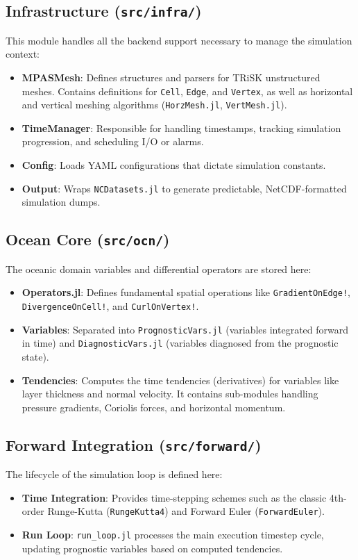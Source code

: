 \documentclass[12pt]{my-preprint}
\begin{document}
\subsection{Infrastructure (\texttt{src/infra/})}
This module handles all the backend support necessary to manage the simulation context:
\begin{itemize}
    \item \textbf{MPASMesh}: Defines structures and parsers for TRiSK unstructured meshes. Contains definitions for \texttt{Cell}, \texttt{Edge}, and \texttt{Vertex}, as well as horizontal and vertical meshing algorithms (\texttt{HorzMesh.jl}, \texttt{VertMesh.jl}).
    \item \textbf{TimeManager}: Responsible for handling timestamps, tracking simulation progression, and scheduling I/O or alarms.
    \item \textbf{Config}: Loads YAML configurations that dictate simulation constants.
    \item \textbf{Output}: Wraps \texttt{NCDatasets.jl} to generate predictable, NetCDF-formatted simulation dumps.
\end{itemize}

\subsection{Ocean Core (\texttt{src/ocn/})}
The oceanic domain variables and differential operators are stored here:
\begin{itemize}
    \item \textbf{Operators.jl}: Defines fundamental spatial operations like \texttt{GradientOnEdge!}, \texttt{DivergenceOnCell!}, and \texttt{CurlOnVertex!}.
    \item \textbf{Variables}: Separated into \texttt{PrognosticVars.jl} (variables integrated forward in time) and \texttt{DiagnosticVars.jl} (variables diagnosed from the prognostic state).
    \item \textbf{Tendencies}: Computes the time tendencies (derivatives) for variables like layer thickness and normal velocity. It contains sub-modules handling pressure gradients, Coriolis forces, and horizontal momentum.
\end{itemize}

\subsection{Forward Integration (\texttt{src/forward/})}
The lifecycle of the simulation loop is defined here:
\begin{itemize}
    \item \textbf{Time Integration}: Provides time-stepping schemes such as the classic 4th-order Runge-Kutta (\texttt{RungeKutta4}) and Forward Euler (\texttt{ForwardEuler}).
    \item \textbf{Run Loop}: \texttt{run\_loop.jl} processes the main execution timestep cycle, updating prognostic variables based on computed tendencies.
\end{itemize}
\end{document}
